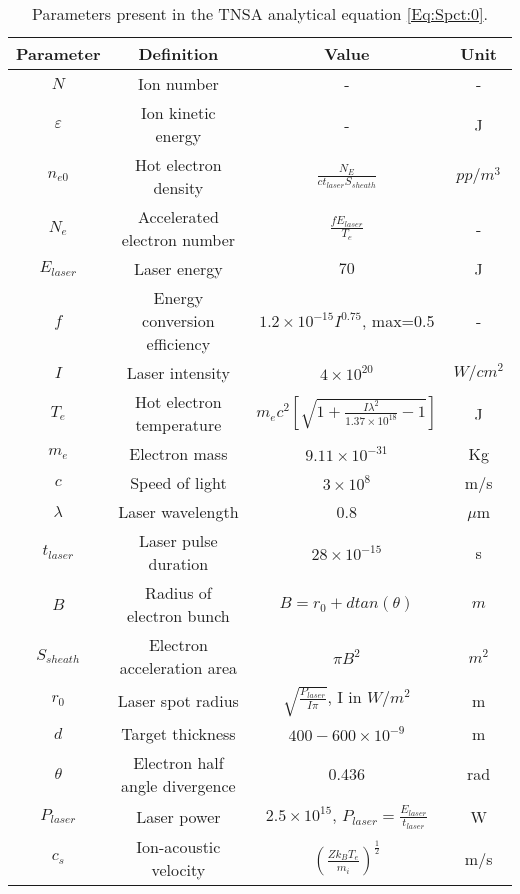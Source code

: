 \begin{table} 
  \caption{
    Parameters present in the TNSA analytical
    equation \ref{Eq:Spct:0}.
  }
  \label{table:EnergySpectrumParameters}
  \begin{center}
    \begin{tabular}{c c c c}
      \hline
      \textbf{Parameter} & \textbf{Definition} & \textbf{Value} & \textbf{Unit} \\ [1ex] 
      \hline \hline
      $N$ & Ion number & - & - \\ 
      $\varepsilon$ & Ion kinetic energy & - & J \\  
      $n_{e0}$ & Hot electron density & $\frac{N_{E}}{c t_{laser} S_{sheath}}$ & $pp/m^3$ \\ 
      $N_{e}$ & Accelerated electron number & $\frac{f E_{laser}}{T_e}$ & - \\ 
      $E_{laser}$ & Laser energy & $70$ & J \\  
      $f$ & Energy conversion efficiency & $1.2 \times 10^{-15} I^{0.75}$, max=0.5  & - \\   %
      $I$ & Laser intensity & $4 \times 10^{20}$ & $W/cm^{2}$ \\ 
      $T_{e}$ & Hot electron temperature & $m_{e} c^{2} [\sqrt{1 + \frac{I \lambda^{2}}{1.37 \times 10^{18}} -1} ]$ & J \\ 
      $m_{e}$ & Electron mass & $9.11 \times 10^{-31}$ & Kg \\ 
      $c$ & Speed of light & $3 \times 10^{8}$ & m/s \\ 
      $\lambda$ & Laser wavelength & 0.8 & $\mu$m \\  
      $t_{laser}$ & Laser pulse duration & $28 \times 10^{-15}$  & s \\  
      $B$ & Radius of electron bunch & $B=r_{0} + d tan(\theta)$ & $m$ \\ 
      $S_{sheath}$ & Electron acceleration area & $\pi B^{2}$ & $m^{2}$ \\ 
      $r_{0}$ & Laser spot radius & $\sqrt{\frac{P_{laser}}{I \pi}}$, I in $W/m^{2}$ & m \\  
      $d$ & Target thickness & $400-600 \times 10^{-9}$ & m \\  
      $\theta$ & Electron half angle divergence & 0.436 & rad \\  
      $P_{laser}$ & Laser power & $2.5 \times 10^{15}$, $P_{laser}=\frac{E_{laser}}{t_{laser}}$ & W \\  
      $c_{s}$ & Ion-acoustic velocity & $(\frac{Z k_{B} T_{e}}{m_{i}})^{\frac{1}{2}}$ & m/s \\  

\end{tabular}
\end{center}
\end{table}
